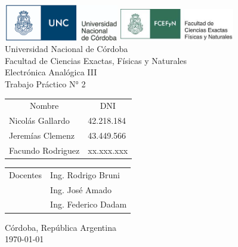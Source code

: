 \begin{titlepage}

\thispagestyle{empty}



\begin{center}
    \includegraphics[width=5cm]{figures/unc_logo.png} \hspace{2cm}
    \includegraphics[width=5cm]{figures/fcefyn_logo.jpg}
    \\[1cm]
    \vspace{5pt}
    \LARGE Universidad Nacional de Córdoba\\[0.5cm] 
    \large Facultad de Ciencias Exactas, Físicas y Naturales \\[0.5cm] 
    \large Electrónica Analógica III
    \\[0.2cm]
    \large Trabajo Práctico N° 2
    \\[0.2cm]
    \vspace{60pt}
    \begin{table}[!h]
    \centering
    \begin{tabular}{ll}
    \multicolumn{1}{c}{Nombre} & \multicolumn{1}{c}{DNI} \\
    Nicolás Gallardo & 42.218.184 \\
    Jeremías Clemenz & 43.449.566 \\
    Facundo Rodriguez & xx.xxx.xxx \\
    
    \end{tabular}
    \end{table}
    \vspace{20pt}
    \begin{table}[!h]
    \centering
    \begin{tabular}{ll}
    \multicolumn{1}{c}{Docentes} & Ing. Rodrigo Bruni \\
     & Ing. José Amado \\
     & Ing. Federico Dadam
    \end{tabular}
    \end{table}
    \vfill
    Córdoba, República Argentina\\
    \today
\end{center}

\end{titlepage}
